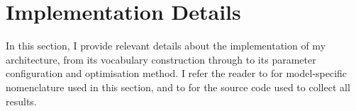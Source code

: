 






\section{Implementation Details}

In this section, I provide relevant details about the implementation of my architecture, from its vocabulary construction through to its parameter configuration and optimisation method. I refer the reader to \chapterautorefname{ \ref{chapter:methodology}} for model-specific nomenclature used in this section, and to \appendixautorefname{ \ref{appendix:resources}} for the source code used to collect all results.

